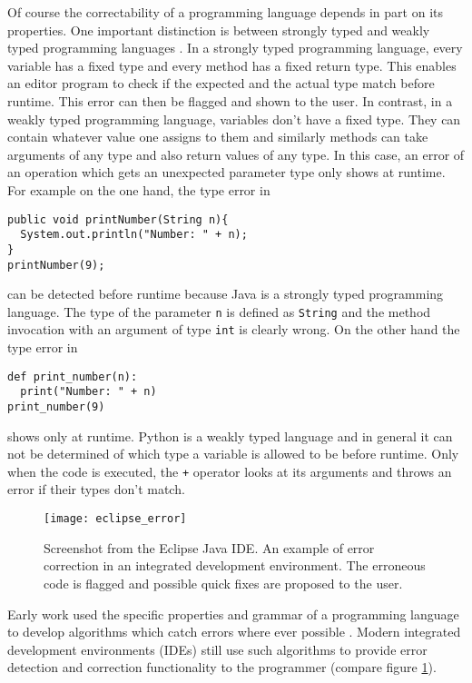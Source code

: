 Of course the correctability of a programming language depends in part on its properties. One important distinction is between strongly typed and weakly typed programming languages \cite{pl_typing}. In a strongly typed programming language, every variable has a fixed type and every method has a fixed return type. This enables an editor program to check if the expected and the actual type match before runtime. This error can then be flagged and shown to the user. In contrast, in a weakly typed programming language, variables don't have a fixed type. They can contain whatever value one assigns to them and similarly methods can take arguments of any type and also return values of any type. In this case, an error of an operation which gets an unexpected parameter type only shows at runtime. For example on the one hand, the type error in

\begin{lstlisting}[style=inline]
public void printNumber(String n){
  System.out.println("Number: " + n);
}
printNumber(9);
\end{lstlisting}

\noindent can be detected before runtime because Java is a strongly typed programming language. The type of the parameter \texttt{n} is defined as \texttt{String} and the method invocation with an argument of type \texttt{int} is clearly wrong. On the other hand the type error in

\lstset{language=Python}
\begin{lstlisting}[style=inline]
def print_number(n):
  print("Number: " + n)
print_number(9)
\end{lstlisting}
\lstset{language=Java}

\noindent shows only at runtime. Python is a weakly typed language and in general it can not be determined of which type a variable is allowed to be before runtime. Only when the code is executed, the \texttt{+} operator looks at its arguments and throws an error if their types don't match.

\begin{figure}[t]
\centering
\texttt{[image: eclipse\_error]}
\caption{Screenshot from the Eclipse Java IDE. An example of error correction in an integrated development environment. The erroneous code is flagged and possible quick fixes are proposed to the user.}
\label{ide_correction}
\end{figure}

Early work used the specific properties and grammar of a programming language to develop algorithms which catch errors where ever possible \cite{syntax_correction_in_pl, analysis_for_editors}. Modern integrated development environments (IDEs) still use such algorithms to provide error detection and correction functionality to the programmer (compare figure \ref{ide_correction}).

